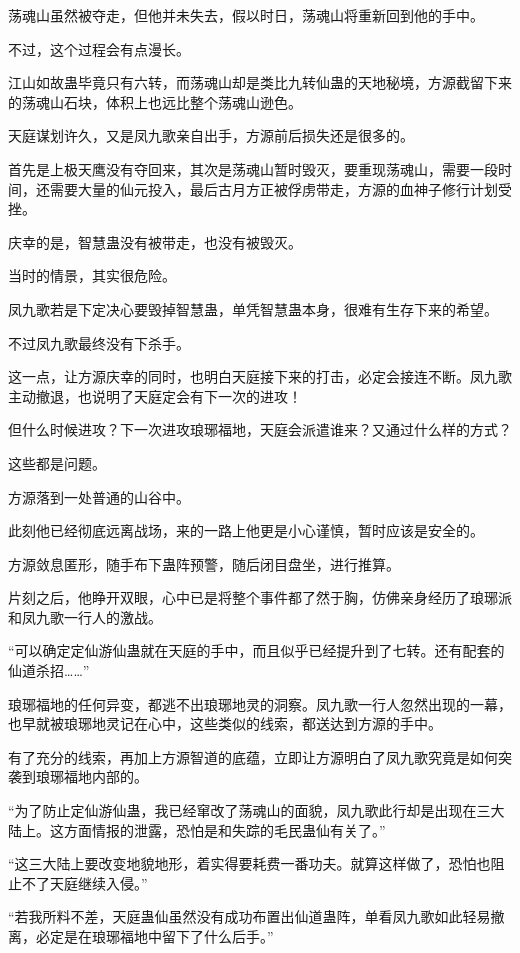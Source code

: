\begin{this_body}
荡魂山虽然被夺走，但他并未失去，假以时日，荡魂山将重新回到他的手中。

不过，这个过程会有点漫长。

江山如故蛊毕竟只有六转，而荡魂山却是类比九转仙蛊的天地秘境，方源截留下来的荡魂山石块，体积上也远比整个荡魂山逊色。

天庭谋划许久，又是凤九歌亲自出手，方源前后损失还是很多的。

首先是上极天鹰没有夺回来，其次是荡魂山暂时毁灭，要重现荡魂山，需要一段时间，还需要大量的仙元投入，最后古月方正被俘虏带走，方源的血神子修行计划受挫。

庆幸的是，智慧蛊没有被带走，也没有被毁灭。

当时的情景，其实很危险。

凤九歌若是下定决心要毁掉智慧蛊，单凭智慧蛊本身，很难有生存下来的希望。

不过凤九歌最终没有下杀手。

这一点，让方源庆幸的同时，也明白天庭接下来的打击，必定会接连不断。凤九歌主动撤退，也说明了天庭定会有下一次的进攻！

但什么时候进攻？下一次进攻琅琊福地，天庭会派遣谁来？又通过什么样的方式？

这些都是问题。

方源落到一处普通的山谷中。

此刻他已经彻底远离战场，来的一路上他更是小心谨慎，暂时应该是安全的。

方源敛息匿形，随手布下蛊阵预警，随后闭目盘坐，进行推算。

片刻之后，他睁开双眼，心中已是将整个事件都了然于胸，仿佛亲身经历了琅琊派和凤九歌一行人的激战。

“可以确定定仙游仙蛊就在天庭的手中，而且似乎已经提升到了七转。还有配套的仙道杀招……”

琅琊福地的任何异变，都逃不出琅琊地灵的洞察。凤九歌一行人忽然出现的一幕，也早就被琅琊地灵记在心中，这些类似的线索，都送达到方源的手中。

有了充分的线索，再加上方源智道的底蕴，立即让方源明白了凤九歌究竟是如何突袭到琅琊福地内部的。

“为了防止定仙游仙蛊，我已经窜改了荡魂山的面貌，凤九歌此行却是出现在三大陆上。这方面情报的泄露，恐怕是和失踪的毛民蛊仙有关了。”

“这三大陆上要改变地貌地形，着实得要耗费一番功夫。就算这样做了，恐怕也阻止不了天庭继续入侵。”

“若我所料不差，天庭蛊仙虽然没有成功布置出仙道蛊阵，单看凤九歌如此轻易撤离，必定是在琅琊福地中留下了什么后手。”


\end{this_body}
